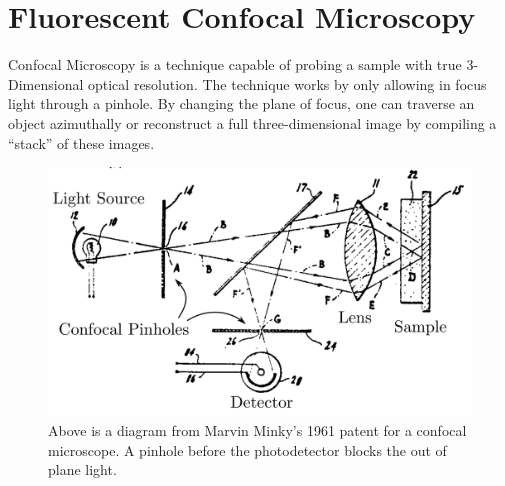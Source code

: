 
\section{Fluorescent Confocal Microscopy} \label{ch:microscopy}
Confocal Microscopy is a technique capable of probing a sample with true 3-Dimensional optical resolution. The technique works by only allowing in focus light through a pinhole. By changing the plane of focus, one can traverse an object azimuthally or reconstruct a full three-dimensional image by compiling a ``stack'' of these images.  

\begin{figure}[h!]
	\centering
	\includegraphics[width=\linewidth]{confocal_stuff/confocalpatent_crop2}
	\caption[Minsky Patent Diagram]{Above is a diagram from Marvin Minky's 1961 patent \cite{patent:3013467} for a confocal microscope. A pinhole before the photodetector blocks the out of plane light.}
	\label{fig:confocalpatent}
\end{figure}


